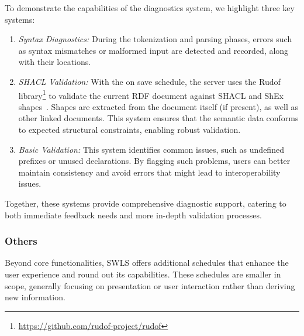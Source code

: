 To demonstrate the capabilities of the diagnostics system, we highlight three key systems:

\begin{enumerate}
  \item \textit{Syntax Diagnostics:}
    During the tokenization and parsing phases, errors such as syntax mismatches or malformed input are detected and recorded, along with their locations.
  \item \textit{SHACL Validation:} 
    With the on save schedule, the server uses the Rudof library\footnote{\url{https://github.com/rudof-project/rudof}} to validate the current RDF document against SHACL and ShEx shapes~\cite{labra2022rudof}.
    Shapes are extracted from the document itself (if present), as well as other linked documents.
    This system ensures that the semantic data conforms to expected structural constraints, enabling robust validation.
  \item \textit{Basic Validation:}
    This system identifies common issues, such as undefined prefixes or unused declarations.
    By flagging such problems, users can better maintain consistency and avoid errors that might lead to interoperability issues.
\end{enumerate}

Together, these systems provide comprehensive diagnostic support, catering to both immediate feedback needs and more in-depth validation processes.

\subsubsection{Others}

Beyond core functionalities, SWLS offers additional schedules that enhance the user experience and round out its capabilities.
These schedules are smaller in scope, generally focusing on presentation or user interaction rather than deriving new information.

